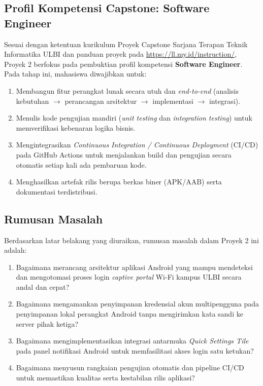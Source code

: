 \subsection{Profil Kompetensi Capstone: Software Engineer}
Sesuai dengan ketentuan kurikulum Proyek Capstone Sarjana Terapan Teknik Informatika ULBI dan panduan proyek pada \url{https://ll.my.id/instruction/}, Proyek 2 berfokus pada pembuktian profil kompetensi \textbf{Software Engineer}. Pada tahap ini, mahasiswa diwajibkan untuk:
\begin{enumerate}
    \item Membangun fitur perangkat lunak secara utuh dan \textit{end-to-end} (analisis kebutuhan $\rightarrow$ perancangan arsitektur $\rightarrow$ implementasi $\rightarrow$ integrasi).
    \item Menulis kode pengujian mandiri (\textit{unit testing} dan \textit{integration testing}) untuk memverifikasi kebenaran logika bisnis.
    \item Mengintegrasikan \textit{Continuous Integration / Continuous Deployment} (CI/CD) pada GitHub Actions untuk menjalankan build dan pengujian secara otomatis setiap kali ada pembaruan kode.
    \item Menghasilkan artefak rilis berupa berkas biner (APK/AAB) serta dokumentasi terdistribusi.
\end{enumerate}

\subsection{Rumusan Masalah}
Berdasarkan latar belakang yang diuraikan, rumusan masalah dalam Proyek 2 ini adalah:
\begin{enumerate}
    \item Bagaimana merancang arsitektur aplikasi Android yang mampu mendeteksi dan mengotomasi proses login \textit{captive portal} Wi-Fi kampus ULBI secara andal dan cepat?
    \item Bagaimana mengamankan penyimpanan kredensial akun multipengguna pada penyimpanan lokal perangkat Android tanpa mengirimkan kata sandi ke server pihak ketiga?
    \item Bagaimana mengimplementasikan integrasi antarmuka \textit{Quick Settings Tile} pada panel notifikasi Android untuk memfasilitasi akses login satu ketukan?
    \item Bagaimana menyusun rangkaian pengujian otomatis dan pipeline CI/CD untuk memastikan kualitas serta kestabilan rilis aplikasi?
\end{enumerate}

